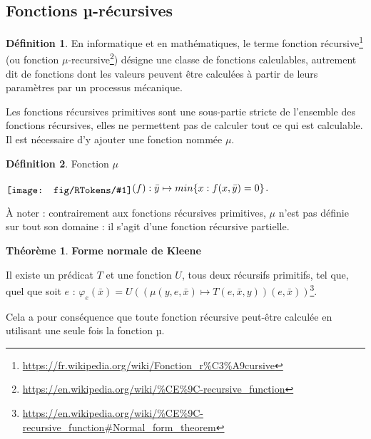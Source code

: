\documentclass{book}
\theoremstyle{definition}
\newtheorem{theorem}{Théorème}
\newtheorem{definition}{Définition}
\numberwithin{lemma}{subsection}
\numberwithin{theorem}{subsection}
\numberwithin{definition}{subsection}
\numberwithin{proposition}{subsection}
\numberwithin{corollary}{subsection}
\numberwithin{property}{subsection}
\numberwithin{example}{subsection}
\numberwithin{heuristique}{subsection}
\numberwithin{scenario}{subsection}
\newcommand{\Token}[1]{\hspace{.25pt}\raisebox{-.2em}{\texttt{[image: fig/RTokens/\#1]}}\hspace{.25pt}}
\begin{document}
        \subsection{Fonctions µ-récursives}
            \begin{definition}
            En informatique et en mathématiques, le terme fonction récursive\footnote{\url{https://fr.wikipedia.org/wiki/Fonction\_r\%C3\%A9cursive}} (ou fonction $\mu$-recursive\footnote{\url{https://en.wikipedia.org/wiki/\%CE\%9C-recursive\_function}}) désigne une classe de fonctions calculables, autrement dit de fonctions dont les valeurs peuvent être calculées à partir de leurs paramètres par un processus mécanique.
            \par Les fonctions récursives primitives sont une sous-partie stricte de l'ensemble des fonctions récursives, elles ne permettent pas de calculer tout ce qui est calculable. Il est nécessaire d'y ajouter une fonction nommée $\mu$.
            \end{definition}
        
            \begin{definition}{Fonction $\mu$}
            \par $\Token{M}(f) : \bar{y} \mapsto min\{x : f(x,\bar{y}) = 0\}$.
            \par À noter : contrairement aux fonctions récursives primitives, $\mu$ n'est pas définie sur tout son domaine : il s'agit d'une fonction récursive partielle.
            \end{definition}
            
            
            
            \begin{theorem}\textbf{Forme normale de Kleene}\label{th:forme_norm_Kleene}
               \par Il existe un prédicat $T$ et une fonction $U$, tous deux récursifs primitifs, tel que, quel que soit $e$ : $ \varphi_e(\bar{x}) = U((\mu(y,e,\bar{x}) \mapsto T(e, \bar{x}, y))(e,\bar{x})) $\footnote{\url{https://en.wikipedia.org/wiki/\%CE\%9C-recursive\_function\#Normal\_form\_theorem}}.
            \end{theorem}
            
            Cela a pour conséquence que toute fonction récursive peut-être calculée en utilisant une seule fois la fonction µ.
            
\end{document}
